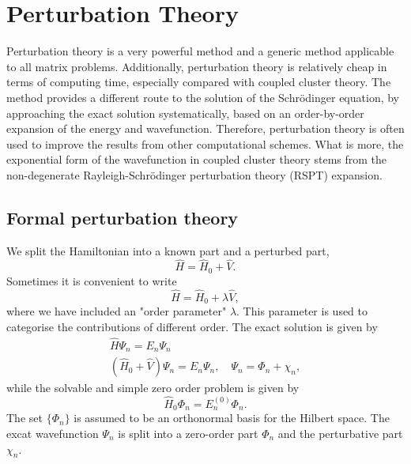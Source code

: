 \chapter{Perturbation Theory}

Perturbation theory is a very powerful method and a generic method applicable to all 
matrix problems. Additionally, perturbation theory is relatively cheap in terms of computing
time, especially compared with coupled cluster theory. The method provides a different 
route to the solution of the Schrödinger equation, by approaching the exact solution 
systematically, based on an order-by-order expansion of the energy and wavefunction. 
Therefore, perturbation theory is often used to improve the results from other computational
schemes. What is more, the exponential form of the wavefunction in coupled cluster theory 
stems from the non-degenerate Rayleigh-Schrödinger perturbation theory (RSPT) expansion.

\section{Formal perturbation theory}

We split the Hamiltonian into a known part and a perturbed part,
\begin{equation}
    \hat{H} = \hat{H}_0 + \hat{V}.
\end{equation}
Sometimes it is convenient to write
\begin{equation}
    \label{eq:schrodinger_w_order_param}
    \hat{H} = \hat{H}_0 + \lambda\hat{V},
\end{equation}
where we have included an "order parameter" $\lambda$. This parameter is used to categorise
the contributions of different order. 
The exact solution is given by
\begin{equation}
    \label{eq:perturbation_schrodinger}
    \begin{gathered}
        \hat{H} \Psi_n = E_n \Psi_n \\
        (\hat{H}_0 + \hat{V}) \Psi_n = E_n \Psi_n, \quad \Psi_n = \Phi_n + \chi_n,
    \end{gathered}
\end{equation}
while the solvable and simple zero order problem is given by
\begin{equation}
    \label{eq:zero_order_perturbed_schrodinger}
    \hat{H}_0 \Phi_n = E_n^{(0)} \Phi_n.
\end{equation}
The set $\{\Phi_n\}$ is assumed to be an orthonormal basis for the Hilbert space. The 
excat wavefunction $\Psi_n$ is split into a zero-order part $\Phi_n$ and the 
perturbative part $\chi_n$.


